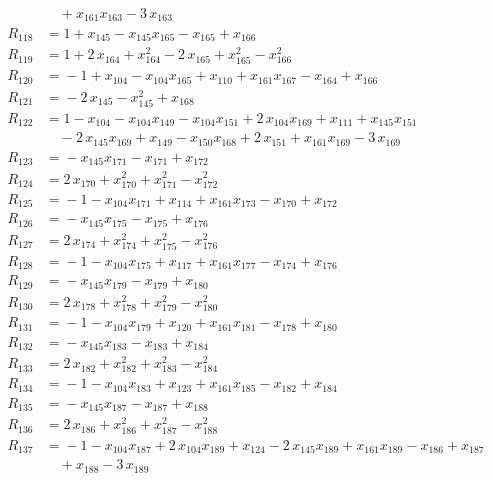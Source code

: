 \begin{align*}
&\quad{} +x_{161} x_{163} -3\,x_{163} \\[2pt]
R_{118} &={} 1 +x_{145} -x_{145} x_{165} -x_{165} +x_{166} \\[2pt]
R_{119} &={} 1 +2\,x_{164} +x_{164}^{2} -2\,x_{165} +x_{165}^{2} -x_{166}^{2} \\[2pt]
R_{120} &={} -1 +x_{104} -x_{104} x_{165} +x_{110} +x_{161} x_{167} -x_{164} +x_{166} \\[2pt]
R_{121} &={} -2\,x_{145} -x_{145}^{2} +x_{168} \\[2pt]
R_{122} &={} 1 -x_{104} -x_{104} x_{149} -x_{104} x_{151} +2\,x_{104} x_{169} +x_{111} +x_{145} x_{151} \\
&\quad{} -2\,x_{145} x_{169} +x_{149} -x_{150} x_{168} +2\,x_{151} +x_{161} x_{169} -3\,x_{169} \\[2pt]
R_{123} &={} -x_{145} x_{171} -x_{171} +x_{172} \\[2pt]
R_{124} &={} 2\,x_{170} +x_{170}^{2} +x_{171}^{2} -x_{172}^{2} \\[2pt]
R_{125} &={} -1 -x_{104} x_{171} +x_{114} +x_{161} x_{173} -x_{170} +x_{172} \\[2pt]
R_{126} &={} -x_{145} x_{175} -x_{175} +x_{176} \\[2pt]
R_{127} &={} 2\,x_{174} +x_{174}^{2} +x_{175}^{2} -x_{176}^{2} \\[2pt]
R_{128} &={} -1 -x_{104} x_{175} +x_{117} +x_{161} x_{177} -x_{174} +x_{176} \\[2pt]
R_{129} &={} -x_{145} x_{179} -x_{179} +x_{180} \\[2pt]
R_{130} &={} 2\,x_{178} +x_{178}^{2} +x_{179}^{2} -x_{180}^{2} \\[2pt]
R_{131} &={} -1 -x_{104} x_{179} +x_{120} +x_{161} x_{181} -x_{178} +x_{180} \\[2pt]
R_{132} &={} -x_{145} x_{183} -x_{183} +x_{184} \\[2pt]
R_{133} &={} 2\,x_{182} +x_{182}^{2} +x_{183}^{2} -x_{184}^{2} \\[2pt]
R_{134} &={} -1 -x_{104} x_{183} +x_{123} +x_{161} x_{185} -x_{182} +x_{184} \\[2pt]
R_{135} &={} -x_{145} x_{187} -x_{187} +x_{188} \\[2pt]
R_{136} &={} 2\,x_{186} +x_{186}^{2} +x_{187}^{2} -x_{188}^{2} \\[2pt]
R_{137} &={} -1 -x_{104} x_{187} +2\,x_{104} x_{189} +x_{124} -2\,x_{145} x_{189} +x_{161} x_{189} -x_{186} +x_{187} \\
&\quad{} +x_{188} -3\,x_{189} \\[2pt]

\end{align*}
